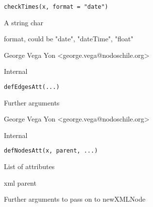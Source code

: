 \documentclass[letterpaper]{book}
\begin{document}
%
\begin{Usage}
\begin{verbatim}
checkTimes(x, format = "date")
\end{verbatim}
\end{Usage}
%
\begin{Arguments}
\begin{ldescription}
\item[\code{x}] A string char
\item[\code{format}] format, could be "date", "dateTime", "float"
\end{ldescription}
\end{Arguments}
%
\begin{Author}\relax
George Vega Yon <george.vega@nodoschile.org>
\end{Author}
%
\begin{Description}\relax
Internal
\end{Description}
%
\begin{Usage}
\begin{verbatim}
defEdgesAtt(...)
\end{verbatim}
\end{Usage}
%
\begin{Arguments}
\begin{ldescription}
\item[\code{...}] Further arguments
\end{ldescription}
\end{Arguments}
%
\begin{Author}\relax
George Vega Yon <george.vega@nodoschile.org>
\end{Author}
%
\begin{Description}\relax
Internal
\end{Description}
%
\begin{Usage}
\begin{verbatim}
defNodesAtt(x, parent, ...)
\end{verbatim}
\end{Usage}
%
\begin{Arguments}
\begin{ldescription}
\item[\code{x}] List of attributes
\item[\code{parent}] xml parent
\item[\code{...}] Further arguments to pass on to newXMLNode
\end{ldescription}
\end{Arguments}
\end{document}
